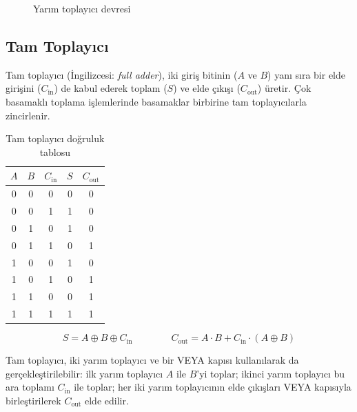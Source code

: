 \begin{figure}[H]
\centering
{}
\caption{Yarım toplayıcı devresi}
\label{fig:ekB-yarim-toplayici}
\end{figure}

\subsection{Tam Toplayıcı}

Tam toplayıcı (İngilizcesi: \textit{full adder}), iki giriş bitinin ($A$ ve $B$) yanı sıra bir elde girişini ($C_{\text{in}}$) de kabul ederek toplam ($S$) ve elde çıkışı ($C_{\text{out}}$) üretir. Çok basamaklı toplama işlemlerinde basamaklar birbirine tam toplayıcılarla zincirlenir.

\begin{table}[H]
\centering
\caption{Tam toplayıcı doğruluk tablosu}
\label{tab:ekB-tam-toplayici}
\begin{tabular}{ccc|cc}
\toprule
$A$ & $B$ & $C_{\text{in}}$ & $S$ & $C_{\text{out}}$ \\
\midrule
0 & 0 & 0 & 0 & 0 \\
0 & 0 & 1 & 1 & 0 \\
0 & 1 & 0 & 1 & 0 \\
0 & 1 & 1 & 0 & 1 \\
1 & 0 & 0 & 1 & 0 \\
1 & 0 & 1 & 0 & 1 \\
1 & 1 & 0 & 0 & 1 \\
1 & 1 & 1 & 1 & 1 \\
\bottomrule
\end{tabular}
\end{table}

\[
S = A \oplus B \oplus C_{\text{in}} \qquad\qquad C_{\text{out}} = A \cdot B + C_{\text{in}} \cdot (A \oplus B)
\]

Tam toplayıcı, iki yarım toplayıcı ve bir VEYA kapısı kullanılarak da gerçekleştirilebilir: ilk yarım toplayıcı $A$ ile $B$'yi toplar; ikinci yarım toplayıcı bu ara toplamı $C_{\text{in}}$ ile toplar; her iki yarım toplayıcının elde çıkışları VEYA kapısıyla birleştirilerek $C_{\text{out}}$ elde edilir.

